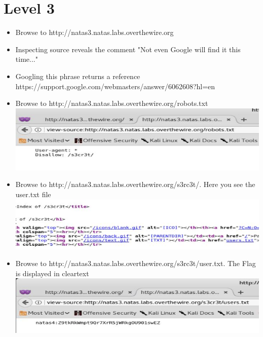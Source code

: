 \documentclass{article}
\begin{document}
\section{Level 3}
    \begin{itemize}
        \item Browse to http://natas3.natas.labs.overthewire.org
        \item Inspecting source reveals the comment "Not even Google will find it this time..."
        \item Googling this phrase returns a reference https://support.google.com/webmasters/answer/6062608?hl=en
        \item Browse to http://natas3.natas.labs.overthewire.org/robots.txt \\ \includegraphics{natas3/no_secrets.JPG}
        \item Browse to http://natas3.natas.labs.overthewire.org/s3rc3t/. Here you see the user.txt file \\ \includegraphics{natas3/found_user.JPG}
        \item Browse to http://natas3.natas.labs.overthewire.org/s3rc3t/user.txt. The Flag is displayed in cleartext \\ \includegraphics{natas3/natas3_flag.JPG}
    \end{itemize}
\end{document}
